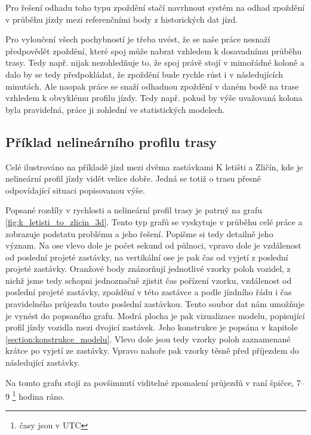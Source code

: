 \bigbreak

Pro řešení odhadu toho typu zpoždění stačí navrhnout systém na odhad zpoždění v průběhu jízdy mezi referenčními body z historických dat jízd.

\bigbreak

Pro vyloučení všech pochybností je třeba uvést, že se naše práce nesnaží předpovědět zpoždění, které spoj může nabrat vzhledem k dosavadnímu průběhu trasy. Tedy např. nijak nezohledňuje to, že spoj právě stojí v mimořádné koloně a dalo by se tedy předpokládat, že zpoždění bude rychle růst i v následujících minutách. Ale naopak práce se snaží odhadnou zpoždění v daném bodě na trase vzhledem k obvyklému profilu jízdy. Tedy např. pokud by výše uvažovaná kolona byla pravidelná, práce ji zohlední ve statistických modelech.


\subsection{Příklad nelineárního profilu trasy} \label{subsection:priklad_nelinearni_trasa}

Celé ilustrováno na příkladě jízd mezi dvěma zastávkami K letišti a Zličín, kde je nelineární profil jízdy vidět velice dobře. Jedná se totiž o trasu přesně odpovídající situaci popisovanou výše.

\bigbreak

Popsané rozdíly v rychlosti a nelineární profil trasy je patrný na grafu \ref{fig:k_letisti_to_zlicin_3d}. Tento typ grafů se vyskytuje v průběhu celé práce a zobrazuje podstatu problému a jeho řešení. Popišme si tedy detailně jeho význam. Na ose vlevo dole je počet sekund od půlnoci, vpravo dole je vzdálenost od poslední projeté zastávky, na vertikální ose je pak čas od vyjetí z poslední projeté zastávky. Oranžové body znázorňují jednotlivé vzorky poloh vozidel, z nichž jsme tedy schopni jednoznačně zjistit čas pořízení vzorku, vzdálenost od poslední projeté zastávky, zpoždění v této zastávce a podle jízdního řádu i čas pravidelného průjezdu touto poslední zastávkou. Tento soubor dat nám umožňuje je vynést do popsaného grafu. Modrá plocha je pak vizualizace modelu, popisující profil jízdy vozidla mezi dvojicí zastávek. Jeho konstrukce je popsána v kapitole \ref{section:konstrukce_modelu}. Vlevo dole jsou tedy vzorky poloh zaznamenané krátce po vyjetí ze zastávky. Vpravo nahoře pak vzorky těsně před příjezdem do následující zastávky.

\bigbreak

Na tomto grafu stojí za povšimnutí viditelné zpomalení průjezdů v raní špičce, 7--9 \footnote{časy jsou v UTC} hodina ráno.

